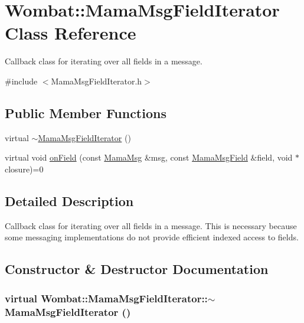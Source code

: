\hypertarget{classWombat_1_1MamaMsgFieldIterator}{
\section{Wombat::MamaMsgFieldIterator Class Reference}
\label{classWombat_1_1MamaMsgFieldIterator}
}


Callback class for iterating over all fields in a message.  


{\ttfamily \#include $<$MamaMsgFieldIterator.h$>$}\subsection*{Public Member Functions}
\begin{DoxyCompactItemize}
\item 
virtual \hyperlink{classWombat_1_1MamaMsgFieldIterator_ad59e4f98b6206d1d69b531cc1d9b8dff}{$\sim$MamaMsgFieldIterator} ()
\item 
virtual void \hyperlink{classWombat_1_1MamaMsgFieldIterator_ace48136b8207b578bc3d0102758bbc06}{onField} (const \hyperlink{classWombat_1_1MamaMsg}{MamaMsg} \&msg, const \hyperlink{classWombat_1_1MamaMsgField}{MamaMsgField} \&field, void $\ast$closure)=0
\end{DoxyCompactItemize}


\subsection{Detailed Description}
Callback class for iterating over all fields in a message. This is necessary because some messaging implementations do not provide efficient indexed access to fields. 

\subsection{Constructor \& Destructor Documentation}
\hypertarget{classWombat_1_1MamaMsgFieldIterator_ad59e4f98b6206d1d69b531cc1d9b8dff}{
\subsubsection[{$\sim$MamaMsgFieldIterator}]{\setlength{\rightskip}{0pt plus 5cm}virtual Wombat::MamaMsgFieldIterator::$\sim$MamaMsgFieldIterator ()}}
\label{classWombat_1_1MamaMsgFieldIterator_ad59e4f98b6206d1d69b531cc1d9b8dff}


